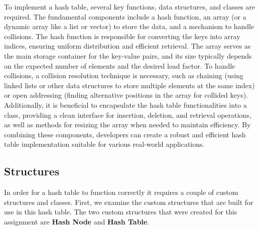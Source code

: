 \documentclass[a4paper,9pt]{article}
\begin{document}
To implement a hash table, several key functions, data structures, and classes are required. The fundamental components include a hash function, an array (or a dynamic array like a list or vector) to store 
the data, and a mechanism to handle collisions. The hash function is responsible for converting the keys into array indices, ensuring uniform distribution and efficient retrieval. The array serves as the 
main storage container for the key-value pairs, and its size typically depends on the expected number of elements and the desired load factor. To handle collisions, a collision resolution technique is 
necessary, such as chaining (using linked lists or other data structures to store multiple elements at the same index) or open addressing (finding alternative positions in the array for collided keys). 
Additionally, it is beneficial to encapsulate the hash table functionalities into a class, providing a clean interface for insertion, deletion, and retrieval operations, as well as methods for resizing the 
array when needed to maintain efficiency. By combining these components, developers can create a robust and efficient hash table implementation suitable for various real-world applications.

\subsection*{Structures}

In order for a hash table to function correctly it requires a couple of custom structures and classes. First, we examine the custom structures that are built for use in this hash table. The two custom structures
that were created for this assignment are \textbf{Hash Node} and \textbf{Hash Table}.
\end{document}
